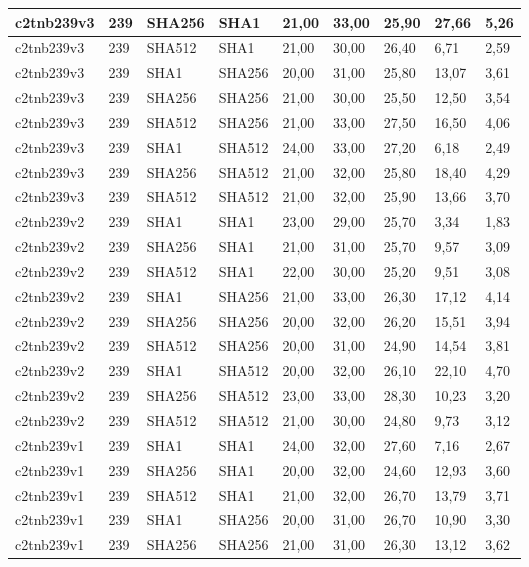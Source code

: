 \begin{longtable}{| l | l | l | l | l |l |l |l |l |}
c2tnb239v3 & 239 & SHA256 & SHA1 & 21,00 & 33,00 & 25,90 & 27,66 & 5,26 \\ \hline 
c2tnb239v3 & 239 & SHA512 & SHA1 & 21,00 & 30,00 & 26,40 & 6,71 & 2,59 \\ \hline 
c2tnb239v3 & 239 & SHA1 & SHA256 & 20,00 & 31,00 & 25,80 & 13,07 & 3,61 \\ \hline 
c2tnb239v3 & 239 & SHA256 & SHA256 & 21,00 & 30,00 & 25,50 & 12,50 & 3,54 \\ \hline 
c2tnb239v3 & 239 & SHA512 & SHA256 & 21,00 & 33,00 & 27,50 & 16,50 & 4,06 \\ \hline 
c2tnb239v3 & 239 & SHA1 & SHA512 & 24,00 & 33,00 & 27,20 & 6,18 & 2,49 \\ \hline 
c2tnb239v3 & 239 & SHA256 & SHA512 & 21,00 & 32,00 & 25,80 & 18,40 & 4,29 \\ \hline 
c2tnb239v3 & 239 & SHA512 & SHA512 & 21,00 & 32,00 & 25,90 & 13,66 & 3,70 \\ \hline 
c2tnb239v2 & 239 & SHA1 & SHA1 & 23,00 & 29,00 & 25,70 & 3,34 & 1,83 \\ \hline 
c2tnb239v2 & 239 & SHA256 & SHA1 & 21,00 & 31,00 & 25,70 & 9,57 & 3,09 \\ \hline 
c2tnb239v2 & 239 & SHA512 & SHA1 & 22,00 & 30,00 & 25,20 & 9,51 & 3,08 \\ \hline 
c2tnb239v2 & 239 & SHA1 & SHA256 & 21,00 & 33,00 & 26,30 & 17,12 & 4,14 \\ \hline 
c2tnb239v2 & 239 & SHA256 & SHA256 & 20,00 & 32,00 & 26,20 & 15,51 & 3,94 \\ \hline 
c2tnb239v2 & 239 & SHA512 & SHA256 & 20,00 & 31,00 & 24,90 & 14,54 & 3,81 \\ \hline 
c2tnb239v2 & 239 & SHA1 & SHA512 & 20,00 & 32,00 & 26,10 & 22,10 & 4,70 \\ \hline 
c2tnb239v2 & 239 & SHA256 & SHA512 & 23,00 & 33,00 & 28,30 & 10,23 & 3,20 \\ \hline 
c2tnb239v2 & 239 & SHA512 & SHA512 & 21,00 & 30,00 & 24,80 & 9,73 & 3,12 \\ \hline 
c2tnb239v1 & 239 & SHA1 & SHA1 & 24,00 & 32,00 & 27,60 & 7,16 & 2,67 \\ \hline 
c2tnb239v1 & 239 & SHA256 & SHA1 & 20,00 & 32,00 & 24,60 & 12,93 & 3,60 \\ \hline 
c2tnb239v1 & 239 & SHA512 & SHA1 & 21,00 & 32,00 & 26,70 & 13,79 & 3,71 \\ \hline 
c2tnb239v1 & 239 & SHA1 & SHA256 & 20,00 & 31,00 & 26,70 & 10,90 & 3,30 \\ \hline 
c2tnb239v1 & 239 & SHA256 & SHA256 & 21,00 & 31,00 & 26,30 & 13,12 & 3,62 \\ \hline 

\end{longtable}
